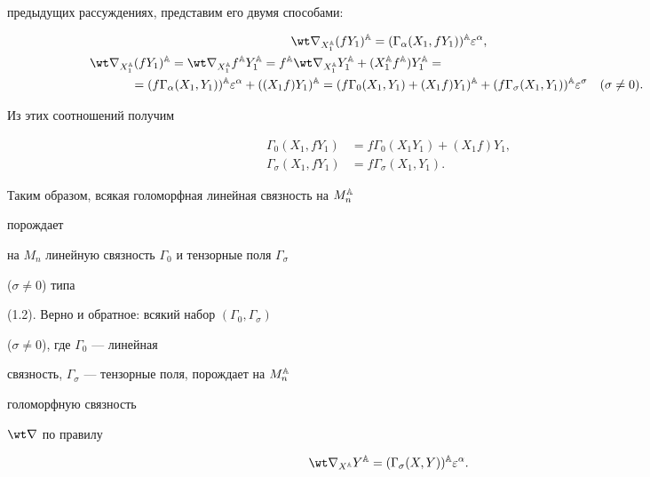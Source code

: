 предыдущих рассуждениях, представим его двумя способами: 


\begin{gather*} 


\wt\nabla_{X\A_1}(fY_1)\A=(\Gamma_\alpha(X_1,fY_1))\A \varepsilon^\alpha,\\ 


%


\wt\nabla_{X\A_1}(fY_1)\A=\wt\nabla_{X\A_1}f\A Y\A_1= 


f\A\wt\nabla_{X\A_1}Y\A_1+(X\A_1 f\A)Y\A_1=\hspace{70mm} \\ 


% 


=(f\Gamma_\alpha(X_1,Y_1))\A\varepsilon^\alpha+ 


((X_1f)Y_1)\A=(f\Gamma_0(X_1,Y_1)+(X_1f)Y_1)\A+ 


(f\Gamma_\sigma(X_1,Y_1))\A\varepsilon^\sigma 


\quad (\sigma\ne 0). 


\end{gather*} 


Из этих соотношений получим 


\begin{align*} 


\Gamma_0(X_1,fY_1)&=f\Gamma_0(X_1Y_1)+(X_1f)Y_1,\\ 


\Gamma_\sigma(X_1,fY_1)&=f\Gamma_\sigma(X_1,Y_1). 


\end{align*} 


 


Таким образом, всякая голоморфная линейная связность на $M^{\Bbb A}_n$ 


порождает 


на $M_n$ линейную связность $\Gamma_0$ и тензорные поля $\Gamma_\sigma$ 


($\sigma\ne 0$) типа  


(1.2). Верно и обратное: всякий набор $(\Gamma_0,\Gamma_\sigma)$ 


($\sigma\ne 0$), где $\Gamma_0$ --- линейная 


связность, $\Gamma_\sigma$ --- тензорные поля, порождает на $M^{\Bbb A}_n$ 


голоморфную связность 


$\wt\nabla$ по правилу 


\begin{equation} 


\wt\nabla_{X\A}Y\A=(\Gamma_\sigma(X,Y))\A\varepsilon^\alpha. 


\end{equation} 



